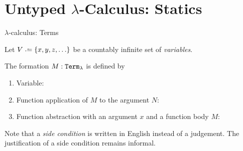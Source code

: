 
\section{Untyped $\lambda$-Calculus: Statics}

\begin{frame}{$\lambda$-calculus: Terms}

Let $V \defeq \{ x, y, z, \ldots \}$ be a countably infinite set of
\emph{variables}.
\begin{definition}
  The formation $M : \term_\lambda$ is defined by
  \begin{enumerate}
    \item Variable:
      \begin{prooftree}
      \end{prooftree}

    \item Function application of $M$ to the argument $N$:
      \begin{prooftree}
      \end{prooftree}

    \item Function abstraction with an argument $x$ and a function body $M$:
      \begin{prooftree}
      \end{prooftree}
  \end{enumerate}
\end{definition}
Note that a \emph{side condition} is written in English instead of a
judgement. The justification of a side condition remains informal.

\end{frame}

